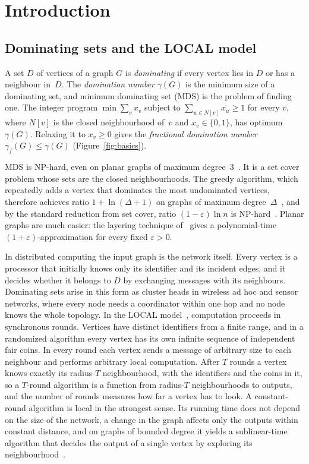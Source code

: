 \documentclass[11pt]{article}
\theoremstyle{remark}
\begin{document}
\section{Introduction}

\subsection{Dominating sets and the LOCAL model}

A set $D$ of vertices of a graph $G$ is \emph{dominating} if every vertex lies in $D$ or has a
neighbour in~$D$. The \emph{domination number} $\gamma(G)$ is the minimum size of a dominating set,
and minimum dominating set (MDS) is the problem of finding one. The integer program
$\min\sum_vx_v$ subject to $\sum_{u\in N[v]}x_u\ge1$ for every $v$, where $N[v]$ is the closed
neighbourhood of~$v$ and $x_v\in\{0,1\}$, has optimum $\gamma(G)$. Relaxing it to $x_v\ge0$ gives
the \emph{fractional domination number} $\gamma_f(G)\le\gamma(G)$ (Figure~\ref{fig:basics}).

MDS is NP-hard, even on planar graphs of maximum degree~$3$~\cite{GJ79}. It is a set cover problem
whose sets are the closed neighbourhoods. The greedy algorithm, which repeatedly adds a vertex that
dominates the most undominated vertices, therefore achieves ratio $1+\ln(\Delta+1)$ on graphs of
maximum degree~$\Delta$~\cite{J74}, and by the standard reduction from set cover, ratio
$(1-\varepsilon)\ln n$ is NP-hard~\cite{DS14}. Planar graphs are much easier: the layering technique
of~\cite{B94} gives a polynomial-time $(1+\varepsilon)$-approximation for every fixed $\varepsilon>0$.

In distributed computing the input graph is the network itself. Every vertex is a processor that
initially knows only its identifier and its incident edges, and it decides whether it belongs to $D$ by
exchanging messages with its neighbours. Dominating sets arise in this form as cluster heads in
wireless ad hoc and sensor networks, where every node needs a coordinator within one hop and no
node knows the whole topology. In the LOCAL model~\cite{L92}, computation proceeds in synchronous
rounds. Vertices have distinct identifiers from a finite range, and in a randomized algorithm every
vertex has its own infinite sequence of independent fair coins. In every round each vertex sends a message of arbitrary size to each neighbour and performs
arbitrary local computation. After $T$ rounds a vertex knows exactly its radius-$T$ neighbourhood,
with the identifiers and the coins in it, so a $T$-round algorithm is a function from radius-$T$
neighbourhoods to outputs, and the number of
rounds measures how far a vertex has to look. A constant-round algorithm is local in the strongest
sense. Its running time does not depend on the size of the network, a change in the graph affects
only the outputs within constant distance, and on graphs of bounded degree it yields a sublinear-time
algorithm that decides the output of a single vertex by exploring its neighbourhood~\cite{PR07}.
\end{document}
